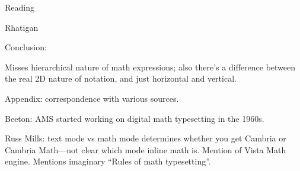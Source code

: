 \documentclass[11pt]{PalisadesLakesBook}
\begin{document}
\begin{plSection}{Reading}
\begin{plSection}{Rhatigan}
\begin{plSection}{}
\begin{plSection}{}
Conclusion:

Misses hierarchical nature of math expressions;
also there's a difference between the real 2D nature of notation,
and just horizontal and vertical.

Appendix: correspondence with various sources.

Beeton: AMS started working on digital math typesetting in the 1960s.

Russ Mills: text mode vs math mode determines whether
you get Cambria or Cambria Math---not clear which mode inline math is.
Mention of Vista Math engine. 
Mentions imaginary ``Rules of math typesetting''.

\end{plSection}%
\end{plSection}%
\end{plSection}%
\begin{plSection}{}
\end{plSection}%
\begin{plSection}{}
\end{plSection}%
\end{plSection}%
\end{document}
